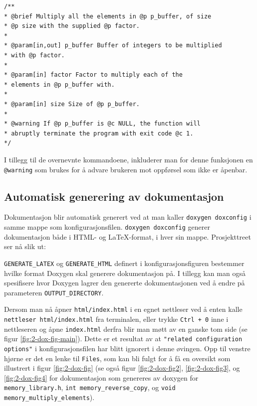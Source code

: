 \begin{alphasection}
\begin{lstlisting}
/**
* @brief Multiply all the elements in @p p_buffer, of size
* @p size with the supplied @p factor.
*
* @param[in,out] p_buffer Buffer of integers to be multiplied
* with @p factor.
*
* @param[in] factor Factor to multiply each of the
* elements in @p p_buffer with.
*
* @param[in] size Size of @p p_buffer.
*
* @warning If @p p_buffer is @c NULL, the function will
* abruptly terminate the program with exit code @c 1.
*/
\end{lstlisting}


I tillegg til de overnevnte kommandoene, inkluderer man for denne funksjonen en \verb|@warning| som brukes for å advare brukeren mot oppførsel som ikke er åpenbar. 

\subsection{Automatisk generering av dokumentasjon}  

Dokumentasjon blir automatisk generert ved at man kaller \verb|doxygen doxconfig| i samme mappe som konfigurasjonsfilen. \verb|doxygen doxconfig| generer dokumentasjon både i HTML- og \LaTeX-format, i hver sin mappe. Prosjekttreet ser nå slik ut:

\verb|GENERATE_LATEX| og \verb|GENERATE_HTML| definert i konfigurasjonsfiguren bestemmer hvilke format Doxygen skal generere dokumentasjon på. I tillegg kan man også spesifisere hvor Doxygen lagrer den genererte dokumentasjonen ved å endre på parameteren \verb|OUTPUT_DIRECTORY|.

Dersom man nå åpner \verb|html/index.html| i en egnet nettleser ved å enten kalle \verb|nettleser html/index.html| fra terminalen, eller trykke \verb|Ctrl + 0| inne i nettleseren og åpne \verb|index.html| derfra blir man møtt av en ganske tom side (se figur \ref{fig:2-dox-fig-main}). Dette er et resultat av at \verb|"related configuration options"| i konfigurasjonsfilen har blitt ignorert i denne øvingen. Opp til venstre hjørne er det en lenke til \verb|Files|, som kan bli fulgt for å få en oversikt som illustrert i figur \ref{fig:2-dox-fig} (se også figur \ref{fig:2-dox-fig2}, \ref{fig:2-dox-fig3}, og  \ref{fig:2-dox-fig4} for dokumentasjon som genereres av doxygen for \verb|memory_library.h|, \verb|int memory_reverse|\verb|_copy|, og \verb|void memory_multiply_elements|).



\end{alphasection}
